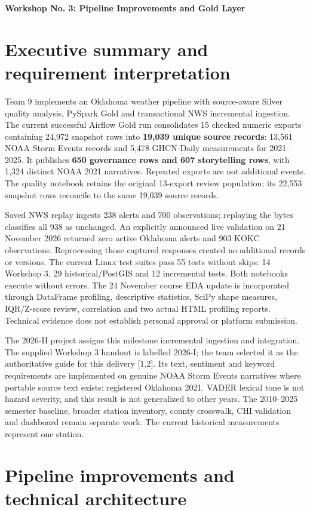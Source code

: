 \documentclass[10pt]{article}
\begin{document}

{\Large\bfseries Workshop No. 3: Pipeline Improvements and Gold Layer}

\section{Executive summary and requirement interpretation}
Team 9 implements an Oklahoma weather pipeline with source-aware Silver quality
analysis, PySpark Gold and transactional NWS incremental ingestion. The current
successful Airflow Gold run consolidates 15 checked numeric exports containing
24,972 snapshot rows into \textbf{19,039 unique source records}: 13,561 NOAA
Storm Events records and 5,478 GHCN-Daily measurements for 2021--2025.
It publishes \textbf{650 governance rows and 607 storytelling rows}, with
1,324 distinct NOAA 2021 narratives. Repeated exports are not additional events.
The quality notebook retains the original 13-export review population;
its 22,553 snapshot rows reconcile to the same 19,039 source records.

Saved NWS replay ingests 238 alerts and 700 observations; replaying the bytes
classifies all 938 as unchanged. An explicitly announced live validation on
21 November 2026 returned zero active Oklahoma alerts and 903 KOKC observations.
Reprocessing those captured responses created no additional records or versions.
The current Linux test suites pass 55 tests without skips: 14 Workshop 3,
29 historical/PostGIS and 12 incremental tests. Both notebooks execute without
errors. The 24 November course EDA update is incorporated through DataFrame
profiling, descriptive statistics, SciPy shape measures, IQR/Z-score review,
correlation and two actual HTML profiling reports.
Technical evidence does not establish personal approval or platform submission.

The 2026-II project assigns this milestone incremental ingestion and integration.
The supplied Workshop 3 handout is labelled 2026-I; the team selected it as the
authoritative guide for this delivery [1,2]. Its text, sentiment and keyword
requirements are implemented on genuine NOAA Storm Events narratives where
portable source text exists: registered Oklahoma 2021. VADER lexical tone is
not hazard severity, and this result is not generalized to other years.
The 2010--2025 semester baseline,
broader station inventory, county crosswalk, CHI validation and dashboard remain
separate work. The current historical measurements represent one station.

\section{Pipeline improvements and technical architecture}
\end{document}
